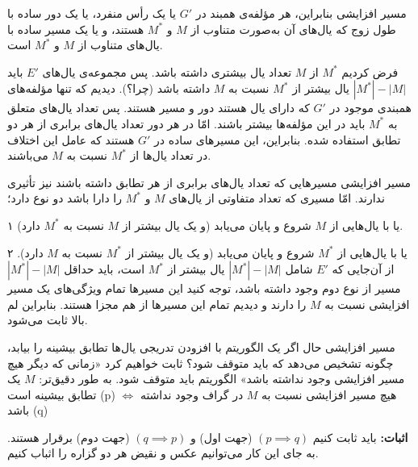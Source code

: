 \begin{itemframe}{مسیر افزایشی}
\itm
بنابراین، هر مؤلفه‌ی همبند در $G'$ یا یک رأس منفرد، یا یک دور ساده با طول زوج که یال‌های آن به‌صورت متناوب از $M$ و $M^*$ هستند، و یا یک مسیر ساده با یال‌های متناوب از $M$ و $M^*$ است.

\itm
فرض کردیم  $M^*$ از $M$ تعداد یال بیشتری داشته باشد.
پس مجموعه‌ی یال‌های $E'$ باید $|M^*| - |M|$ یال بیشتر از $M^*$ نسبت به $M$ داشته باشد (چرا؟).
\itm
دیدیم که تنها مؤلفه‌های همبندی موجود در $G'$ که دارای یال ‌هستند دور و مسیر هستند. پس تعداد یال‌های متعلق به $M^*$ باید در این مؤلفه‌ها بیشتر باشند. امّا در هر دور تعداد یال‌های برابری از هر دو تطابق استفاده شده. بنابراین، این مسیرهای ساده در $G'$ هستند که عامل این اختلاف در تعداد یال‌ها از $M^*$ نسبت به $M$ می‌باشند.

\end{itemframe}


\begin{itemframe}{مسیر افزایشی}
\itm
مسیرهایی که تعداد یال‌های برابری از هر تطابق داشته باشند نیز تأثیری ندارند. امّا مسیری که تعداد متفاوتی از یال‌های $M$ و $M^*$ را دارا باشد دو نوع دارد؛
\item[۱]
یا با یال‌هایی از $M$ شروع و پایان می‌یابد (و یک یال بیشتر از $M$ نسبت به $M^*$ دارد).
\item[۲]
یا با یال‌هایی از $M^*$ شروع و پایان می‌یابد (و یک یال بیشتر از $M^*$ نسبت به $M$ دارد).
\itm
از آن‌جایی که $E'$ شامل $|M^*| - |M|$ یال بیشتر از $M^*$ است، باید حداقل $|M^*| - |M|$ مسیر از نوع دوم وجود داشته باشد، توجه کنید این مسیرها تمام ویژگی‌های یک مسیر افزایشی نسبت به $M$ را دارند و دیدیم تمام این مسیرها از هم مجزا هستند. بنابراین لم بالا ثابت می‌شود.
\end{itemframe}



\begin{itemframe}{مسیر افزایشی}
\itm
حال اگر یک الگوریتم با افزودن تدریجی یال‌ها تطابق بیشینه را بیابد، چگونه تشخیص می‌دهد که باید متوقف شود؟ ثابت خواهیم کرد «زمانی که دیگر هیچ مسیر افزایشی وجود نداشته باشد» الگوریتم باید متوقف شود. به طور دقیق‌تر:
\itm
$M$ یک تطابق بیشینه است (p)
$\iff$
 هیچ مسیر افزایشی نسبت به $M$ در گراف وجود نداشته باشد (q)

\itm
\textbf{اثبات:}
باید ثابت کنیم
$(p \implies q) $
 (جهت اول) و
$ (q \implies p)$
 (جهت دوم) برقرار هستند. به جای این کار می‌توانیم عکس و نقیض
 هر دو گزاره را اثباب کنیم.

\end{itemframe}


